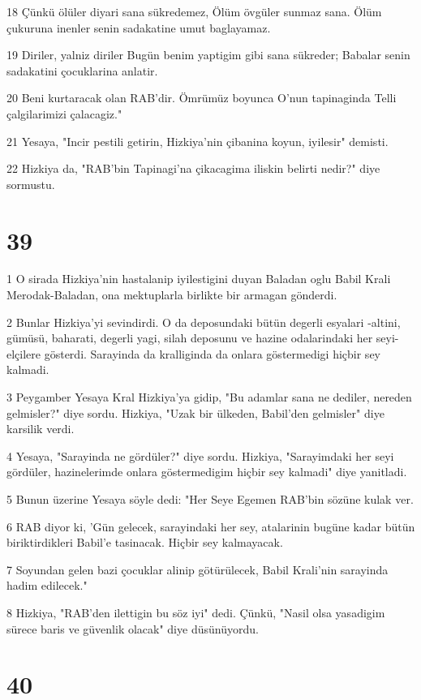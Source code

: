 \par 18 Çünkü ölüler diyari sana sükredemez, Ölüm övgüler sunmaz sana. Ölüm çukuruna inenler senin sadakatine umut baglayamaz.
\par 19 Diriler, yalniz diriler Bugün benim yaptigim gibi sana sükreder; Babalar senin sadakatini çocuklarina anlatir.
\par 20 Beni kurtaracak olan RAB'dir. Ömrümüz boyunca O'nun tapinaginda Telli çalgilarimizi çalacagiz."
\par 21 Yesaya, "Incir pestili getirin, Hizkiya'nin çibanina koyun, iyilesir" demisti.
\par 22 Hizkiya da, "RAB'bin Tapinagi'na çikacagima iliskin belirti nedir?" diye sormustu.

\chapter{39}

\par 1 O sirada Hizkiya'nin hastalanip iyilestigini duyan Baladan oglu Babil Krali Merodak-Baladan, ona mektuplarla birlikte bir armagan gönderdi.
\par 2 Bunlar Hizkiya'yi sevindirdi. O da deposundaki bütün degerli esyalari -altini, gümüsü, baharati, degerli yagi, silah deposunu ve hazine odalarindaki her seyi- elçilere gösterdi. Sarayinda da kralliginda da onlara göstermedigi hiçbir sey kalmadi.
\par 3 Peygamber Yesaya Kral Hizkiya'ya gidip, "Bu adamlar sana ne dediler, nereden gelmisler?" diye sordu. Hizkiya, "Uzak bir ülkeden, Babil'den gelmisler" diye karsilik verdi.
\par 4 Yesaya, "Sarayinda ne gördüler?" diye sordu. Hizkiya, "Sarayimdaki her seyi gördüler, hazinelerimde onlara göstermedigim hiçbir sey kalmadi" diye yanitladi.
\par 5 Bunun üzerine Yesaya söyle dedi: "Her Seye Egemen RAB'bin sözüne kulak ver.
\par 6 RAB diyor ki, 'Gün gelecek, sarayindaki her sey, atalarinin bugüne kadar bütün biriktirdikleri Babil'e tasinacak. Hiçbir sey kalmayacak.
\par 7 Soyundan gelen bazi çocuklar alinip götürülecek, Babil Krali'nin sarayinda hadim edilecek."
\par 8 Hizkiya, "RAB'den ilettigin bu söz iyi" dedi. Çünkü, "Nasil olsa yasadigim sürece baris ve güvenlik olacak" diye düsünüyordu.

\chapter{40}

